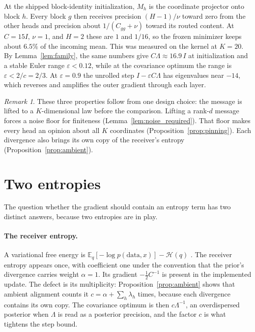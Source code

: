\documentclass[11pt]{article}
\theoremstyle{definition}
\theoremstyle{remark}
\newtheorem{remark}{Remark}
\newcommand{\E}{\mathbb{E}}
\newcommand{\Hent}{\mathcal{H}}
\begin{document}
At the shipped block-identity initialization, $M_h$ is the coordinate projector onto block $h$. Every block $g$ then receives precision $(H-1)/\nu$ toward zero from the other heads and precision about $1/(C_{gg}+\nu)$ toward its routed content. At $C=15I$, $\nu=1$, and $H=2$ these are $1$ and $1/16$, so the frozen minimizer keeps about $6.5\%$ of the incoming mean. This was measured on the kernel at $K=20$. By Lemma~\ref{lem:family}, the same numbers give $C\Lambda\approx16.9\,I$ at initialization and a stable Euler range $\varepsilon<0.12$, while at the covariance optimum the range is $\varepsilon<2/c=2/3$. At $\varepsilon=0.9$ the unrolled step $I-\varepsilon C\Lambda$ has eigenvalues near $-14$, which reverses and amplifies the outer gradient through each layer.

\begin{remark}
These three properties follow from one design choice: the message is lifted to a $K$-dimensional law before the comparison. Lifting a rank-$d$ message forces a noise floor for finiteness (Lemma~\ref{lem:noise_required}). That floor makes every head an opinion about all $K$ coordinates (Proposition~\ref{prop:pinning}). Each divergence also brings its own copy of the receiver's entropy (Proposition~\ref{prop:ambient}).
\end{remark}

\section{Two entropies}
\label{sec:entropy}

The question whether the gradient should contain an entropy term has two distinct answers, because two entropies are in play.

\paragraph{The receiver entropy.}
A variational free energy is $\E_q[-\log p(\text{data},x)]-\Hent(q)$ \citep{blei2017variational}. The receiver entropy appears once, with coefficient one under the convention that the prior's divergence carries weight $\alpha=1$. Its gradient $-\tfrac12C^{-1}$ is present in the implemented update. The defect is its multiplicity: Proposition~\ref{prop:ambient} shows that ambient alignment counts it $c=\alpha+\sum_h\lambda_h$ times, because each divergence contains its own copy. The covariance optimum is then $c\Lambda^{-1}$, an overdispersed posterior when $\Lambda$ is read as a posterior precision, and the factor $c$ is what tightens the step bound.
\end{document}
